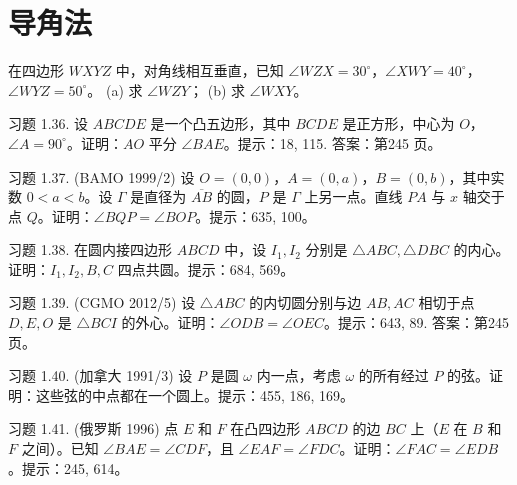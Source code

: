 \part{导角法}





\begin{exercise}
在四边形 $WXYZ$ 中，对角线相互垂直，已知 $\angle WZX = 30^\circ$，$\angle XWY = 40^\circ$，$\angle WYZ = 50^\circ$。
(a) 求 $\angle WZY$；
(b) 求 $\angle WXY$。
\end{exercise}


\begin{exercise}
习题 1.36. 设 $ABCDE$ 是一个凸五边形，其中 $BCDE$ 是正方形，中心为 $O$，$\angle A = 90^\circ$。证明：$AO$ 平分 $\angle BAE$。提示：18, 115. 答案：第245 页。
\end{exercise}


\begin{exercise}
习题 1.37. (BAMO 1999/2) 设 $O = (0, 0)$，$A = (0, a)$，$B = (0, b)$，其中实数 $0 < a < b$。设 $\Gamma$ 是直径为 $\overline{AB}$ 的圆，$P$ 是 $\Gamma$ 上另一点。直线 $PA$ 与 $x$ 轴交于点 $Q$。证明：$\angle BQP = \angle BOP$。提示：635, 100。
\end{exercise}


\begin{exercise}
    习题 1.38. 在圆内接四边形 $ABCD$ 中，设 $I_1, I_2$ 分别是 $\triangle ABC, \triangle DBC$ 的内心。证明：$I_1, I_2, B, C$ 四点共圆。提示：684, 569。
\end{exercise}


\begin{exercise}
    习题 1.39. (CGMO 2012/5) 设 $\triangle ABC$ 的内切圆分别与边 $AB, AC$ 相切于点 $D, E, O$ 是 $\triangle BCI$ 的外心。证明：$\angle ODB = \angle OEC$。提示：643, 89. 答案：第245 页。
\end{exercise}


\begin{exercise}
    习题 1.40. (加拿大 1991/3) 设 $P$ 是圆 $\omega$ 内一点，考虑 $\omega$ 的所有经过 $P$ 的弦。证明：这些弦的中点都在一个圆上。提示：455, 186, 169。
\end{exercise}



\begin{exercise}
    习题 1.41. (俄罗斯 1996) 点 $E$ 和 $F$ 在凸四边形 $ABCD$ 的边 $BC$ 上（$E$ 在 $B$ 和 $F$ 之间）。已知 $\angle BAE = \angle CDF$，且 $\angle EAF = \angle FDC$。证明：$\angle FAC = \angle EDB$。提示：245, 614。
\end{exercise}


